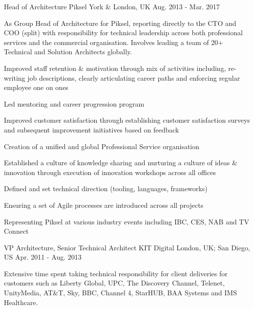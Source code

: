 \begin{cventries}
\cvexpentry
{Head of Architecture} %
{Piksel} %
{York \& London, UK} %
{Aug. 2013 - Mar. 2017} %
{
\begin{cvitemstitle}
\item {As Group Head of Architecture for Piksel, reporting directly to the CTO and COO (split) with responsibility for technical leadership across both professional services and the commercial organisation. Involves leading a team of 20+ Technical and Solution Architects globally.}
\end{cvitemstitle}
}
{ %
\begin{cvitems}
\item {Improved staff retention \& motivation through mix of activities including, re-writing job descriptions, clearly articulating career paths and enforcing regular employee one on ones}
\item {Led mentoring and career progression program}
\item {Improved customer satisfaction through establishing customer satisfaction surveys and subsequent improvement initiatives based on feedback}
\item {Creation of a unified and global Professional Service organisation}
\item {Established a culture of knowledge sharing and nurturing a culture of ideas \& innovation through execution of innovation workshops across all offices}
\item {Defined and set technical direction (tooling, languages, frameworks)}
\item {Ensuring a set of Agile processes are introduced across all projects}
\item {Representing Piksel at various industry events including IBC, CES, NAB and TV Connect}
\end{cvitems}
}


\cvexpentry
{VP Architecture, Senior Technical Architect} %
{KIT Digital} %
{London, UK; San Diego, US} %
{Apr. 2011 - Aug. 2013} %
{
\begin{cvitemstitle}
\item {Extensive time spent taking technical responsibility for client deliveries for customers such as Liberty Global, UPC, The Discovery Channel, Telenet, UnityMedia, AT\&T, Sky, BBC, Channel 4, StarHUB, BAA Systems and IMS Healthcare.}
\end{cvitemstitle}
}
{ %
\begin{cvitems}
\end{cvitems}
}


\end{cventries}
